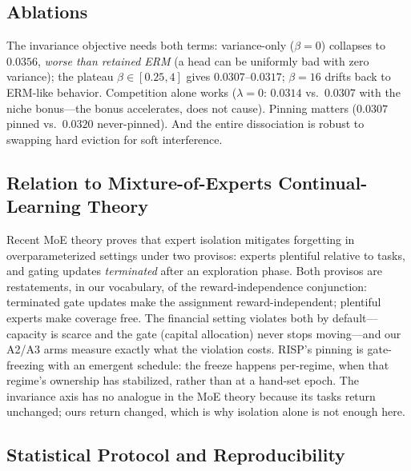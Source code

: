 \documentclass[10pt]{article}
\newcommand{\nm}{\textsc{RISP}}
\begin{document}
\subsection{Ablations}

The invariance objective needs both terms: variance-only ($\beta = 0$)
collapses to $0.0356$, \emph{worse than retained ERM} (a head can be
uniformly bad with zero variance); the plateau $\beta \in [0.25, 4]$
gives $0.0307$--$0.0317$; $\beta = 16$ drifts back to ERM-like behavior.
Competition alone works ($\lambda = 0$: $0.0314$ vs.\ $0.0307$ with the
niche bonus---the bonus accelerates, does not cause). Pinning matters
($0.0307$ pinned vs.\ $0.0320$ never-pinned). And the entire dissociation
is robust to swapping hard eviction for soft interference.

\subsection{Relation to Mixture-of-Experts Continual-Learning Theory}

Recent MoE theory \cite{li2024moecl} proves that expert isolation mitigates
forgetting in overparameterized settings under two provisos: experts
plentiful relative to tasks, and gating updates \emph{terminated} after an
exploration phase. Both provisos are restatements, in our vocabulary, of
the reward-independence conjunction: terminated gate updates make the
assignment reward-independent; plentiful experts make coverage free. The
financial setting violates both by default---capacity is scarce and the
gate (capital allocation) never stops moving---and our A2/A3 arms measure
exactly what the violation costs. \nm{}'s pinning is gate-freezing with an
emergent schedule: the freeze happens per-regime, when that regime's
ownership has stabilized, rather than at a hand-set epoch. The invariance
axis has no analogue in the MoE theory because its tasks return unchanged;
ours return changed, which is why isolation alone is not enough here.

\subsection{Statistical Protocol and Reproducibility}
\end{document}
